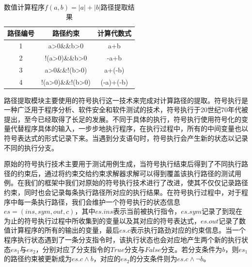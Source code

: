 \begin{table}
  \centering
  \begin{tabular}{ccc}
    \toprule
    \textbf{路径编号} & \textbf{路径约束} & \textbf{计算代数式} \\
    \midrule
    1 & a>0\&\&b>0 & a+b \\
    2 & !(a>0)\&\&b>0 & -a+b \\
    3 & a>0\&\&!(b>0) & a+(-b) \\
    4 & !(a>0)\&\&!(b>0) & (-a)+(-b) \\
    \bottomrule
  \end{tabular}
  \caption{数值计算程序$f(a,b)=|a|+|b|$路径提取结果}\label{tbl:abssumres}
\end{table}

路径提取模块主要使用的符号执行这一技术来完成对计算路径的提取。符号执行是一种广泛用于程序分析、软件安全和软件测试的技术，符号执行于20世纪70年代被提出，至今已经取得了长足的发展。不同于具体的执行，符号执行使用符号化的变量代替程序具体的输入，一步步地执行程序，在执行过程中，所有的中间变量也以符号表达式的形式记录下来。当遇到分支语句时，符号执行会产生新的状态以记录不同的执行分支。

原始的符号执行技术主要用于测试用例生成，当符号执行结束后得到了不同执行路径的约束后，通过将约束交给约束求解器求解可以得到覆盖该执行路径的测试用例。在我们的框架中我们对原始的符号执行技术进行了改进，使其不仅仅记录路径约束，同时也会记录每条执行路径所对应的执行结果。在符号执行过程中，对于程序中每一条执行路径，我们会维护一个符号执行的状态信息$es=(ins, sym, out, c)$，其中$es.ins$表示当前被执行指令，$es.sym$记录了到现在为止的符号执行过程中所收集到的变量以及其对应的符号表达式，$es.out$记录了数值计算程序的所有的输出的变量，最后$es.c$表示执行路劲对应的约束信息。当一个程序执行状态遇到了一条分支指令时，该执行状态也会对应地产生两个新的执行状态$es_1$与$es_2$，分别对应了分支指令的$True$分支与$False$分支。若分支条件为$b$，则$es_1$的路径约束被更新成为$es.c \wedge b$，对应的$es_2$的分支条件则为$es.c \wedge \neg b$。

